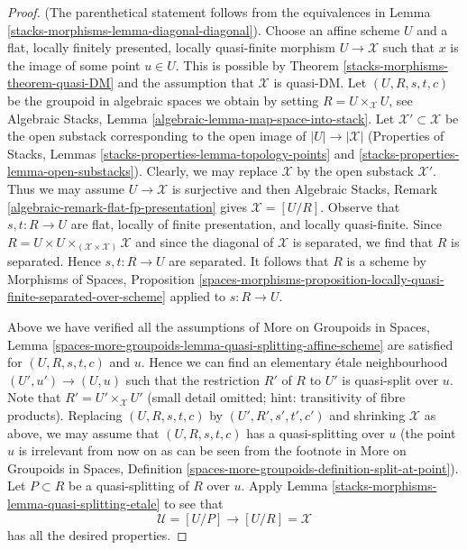 \begin{proof}
(The parenthetical statement follows from the equivalences in
Lemma \ref{stacks-morphisms-lemma-diagonal-diagonal}).
Choose an affine scheme $U$ and a flat, locally finitely presented,
locally quasi-finite morphism $U \to \mathcal{X}$ such that $x$
is the image of some point $u \in U$. This is possible by
Theorem \ref{stacks-morphisms-theorem-quasi-DM} and the assumption that $\mathcal{X}$
is quasi-DM. Let $(U, R, s, t, c)$ be the groupoid in algebraic spaces
we obtain by setting $R = U \times_\mathcal{X} U$, see
Algebraic Stacks, Lemma \ref{algebraic-lemma-map-space-into-stack}.
Let $\mathcal{X}' \subset \mathcal{X}$ be the open substack corresponding
to the open image of $|U| \to |\mathcal{X}|$
(Properties of Stacks, Lemmas
\ref{stacks-properties-lemma-topology-points} and
\ref{stacks-properties-lemma-open-substacks}).
Clearly, we may replace $\mathcal{X}$ by the open substack $\mathcal{X}'$.
Thus we may assume $U \to \mathcal{X}$ is surjective and then
Algebraic Stacks, Remark \ref{algebraic-remark-flat-fp-presentation}
gives $\mathcal{X} = [U/R]$.
Observe that $s, t : R \to U$ are flat, locally of finite presentation,
and locally quasi-finite.
Since $R = U \times U \times_{(\mathcal{X} \times \mathcal{X})} \mathcal{X}$
and since the diagonal of $\mathcal{X}$ is separated, we find that
$R$ is separated. Hence $s, t : R \to U$ are separated. It follows
that $R$ is a scheme by
Morphisms of Spaces, Proposition
\ref{spaces-morphisms-proposition-locally-quasi-finite-separated-over-scheme}
applied to $s : R \to U$.

\medskip\noindent
Above we have verified all the assumptions of
More on Groupoids in Spaces, Lemma
\ref{spaces-more-groupoids-lemma-quasi-splitting-affine-scheme}
are satisfied for $(U, R, s, t, c)$ and $u$.
Hence we can find an elementary \'etale neighbourhood
$(U', u') \to (U, u)$ such that the restriction $R'$ of $R$ to $U'$
is quasi-split over $u$. Note that $R' = U' \times_\mathcal{X} U'$
(small detail omitted; hint: transitivity of fibre products).
Replacing $(U, R, s, t, c)$ by $(U', R', s', t', c')$ and shrinking
$\mathcal{X}$ as above, we may assume that $(U, R, s, t, c)$ has
a quasi-splitting over $u$ (the point $u$ is irrelevant from
now on as can be seen from the footnote in
More on Groupoids in Spaces, Definition
\ref{spaces-more-groupoids-definition-split-at-point}).
Let $P \subset R$ be a quasi-splitting of $R$ over $u$.
Apply Lemma \ref{stacks-morphisms-lemma-quasi-splitting-etale}
to see that
$$
\mathcal{U} = [U/P] \longrightarrow [U/R] = \mathcal{X}
$$
has all the desired properties.
\end{proof}

